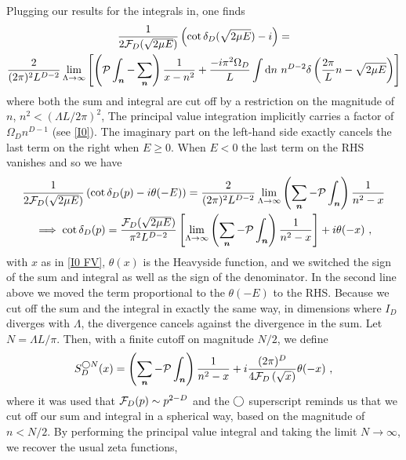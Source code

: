 Plugging our results for the integrals in, one finds
\begin{multline}
    \frac{1}{2\mathcal{F}_{D}(\sqrt{2\mu E})}\left(\cot \delta_{D}(\sqrt{2\mu E}) - i\right)
    =\\
    \frac{2}{(2\pi)^2 L^{D-2}}
    \lim\limits_{\Lambda \to \infty}
    \left[
    	\left(\mathcal{P}\int_{\boldsymbol{n}} - \sum_{\boldsymbol{n}}\right) \frac{1}{x-n^2} +
		\frac{-i \pi^2\Omega_D}{L} \int \mathrm{d}n\ n^{D-2} \delta\left(\frac{2\pi}{L}n - \sqrt{2\mu E}\right)
	\right]
\end{multline}
where both the sum and integral are cut off by a restriction on the magnitude of $n$, $n^2 < (\Lambda L / 2\pi)^2$,
The principal value integration implicitly carries a factor of $\Omega_D n^{D-1}$ (see \eqref{I0}).
The imaginary part on the left-hand side exactly cancels the last term on the right when $E\ge0$.  When $E<0$ the last term on the RHS vanishes and so we have
\begin{multline}\label{eq:general luscher}
   \frac{1}{2\mathcal{F}_{D}(\sqrt{2\mu E})}  \left( \cot \delta_{D}(p)-i\theta(-E)\right)
    =
   \frac{2}{(2\pi)^2 L^{D-2}}
    \lim\limits_{\Lambda \to \infty}\left(\sum_{\boldsymbol{n}}-\mathcal{P}\int_{\boldsymbol{n}}\right) \frac{1}{n^2-x}\\
    \implies
      \cot \delta_{D}(p)= \frac{\mathcal{F}_{D}(\sqrt{2\mu E})}{\pi^2 L^{D-2}}\left[
    \lim\limits_{\Lambda \to \infty}\left(\sum_{\boldsymbol{n}}-\mathcal{P}\int_{\boldsymbol{n}}\right) \frac{1}{n^2-x}\right]
    +i\theta(-x)
    \ ,
\end{multline}
with $x$ as in \eqref{I0 FV}, $\theta(x)$ is the Heavyside function, and we switched the sign of the sum and integral as well as the sign of the denominator.  In the second line above we moved the term proportional to the $\theta(-E)$ to the RHS.
Because we cut off the sum and the integral in exactly the same way, in dimensions where $I_D$ diverges with $\Lambda$, the divergence cancels against the divergence in the sum.
Let $N=\Lambda L/\pi$.
Then, with a finite cutoff on magnitude $N/2$, we define
\begin{equation}\label{eq:spherical cutoff S}
    S^{\spherical N}_D(x) =
    \left(\sum_{\vec{n}}- \mathcal{P}\int_{\vec{n}}\right) \frac{1}{n^2-x}
    + i \frac{(2\pi)^D}{4 \F_D\left(\sqrt{x}\right)}\theta(-x)\ ,
\end{equation}
where it was used that $\mathcal{F}_D(p) \sim p^{2-D}$ and the $\bigcirc$ superscript reminds us that we cut off our sum and integral in a spherical way, based on the magnitude of $n<N/2$.   By performing the principal value integral and taking the limit $N\to \infty$, we recover the usual \Luscher zeta functions,
